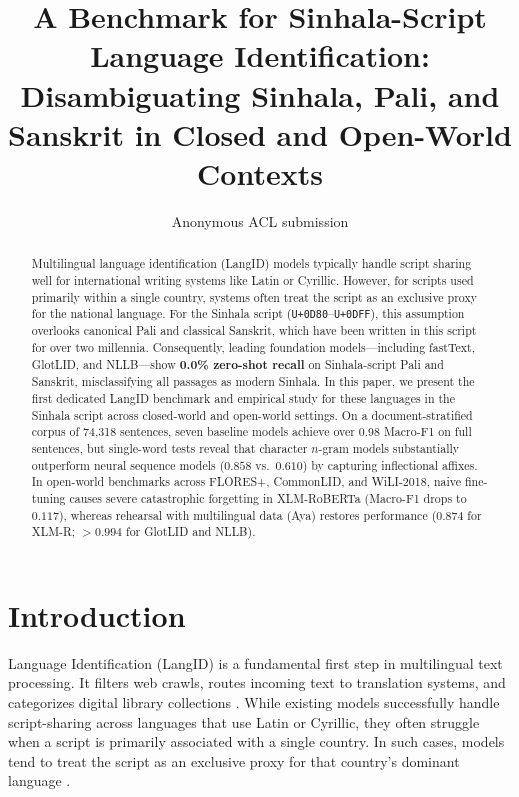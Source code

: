 \documentclass[11pt]{article}
\title{A Benchmark for Sinhala-Script Language Identification: \\ Disambiguating Sinhala, Pali, and Sanskrit in Closed and Open-World Contexts}
\author{Anonymous ACL submission}
\begin{document}
\maketitle

\begin{abstract}
Multilingual language identification (LangID) models typically handle script sharing well for international writing systems like Latin or Cyrillic. However, for scripts used primarily within a single country, systems often treat the script as an exclusive proxy for the national language. For the Sinhala script (\texttt{U+0D80}--\texttt{U+0DFF}), this assumption overlooks canonical Pali and classical Sanskrit, which have been written in this script for over two millennia. Consequently, leading foundation models---including fastText, GlotLID, and NLLB---show \textbf{0.0\% zero-shot recall} on Sinhala-script Pali and Sanskrit, misclassifying all passages as modern Sinhala. In this paper, we present the first dedicated LangID benchmark and empirical study for these languages in the Sinhala script across closed-world and open-world settings. On a document-stratified corpus of 74,318 sentences, seven baseline models achieve over 0.98 Macro-F1 on full sentences, but single-word tests reveal that character $n$-gram models substantially outperform neural sequence models ($0.858$ vs.\ $0.610$) by capturing inflectional affixes. In open-world benchmarks across FLORES+, CommonLID, and WiLI-2018, naive fine-tuning causes severe catastrophic forgetting in XLM-RoBERTa (Macro-F1 drops to $0.117$), whereas rehearsal with multilingual data (Aya) restores performance ($0.874$ for XLM-R; $>0.994$ for GlotLID and NLLB).
\end{abstract}

\section{Introduction}
Language Identification (LangID) is a fundamental first step in multilingual text processing. It filters web crawls, routes incoming text to translation systems, and categorizes digital library collections \cite{jauhiainen2019automatic,lui-baldwin-2012-langid,caswell-etal-2020-language}. While existing models successfully handle script-sharing across languages that use Latin or Cyrillic, they often struggle when a script is primarily associated with a single country. In such cases, models tend to treat the script as an exclusive proxy for that country's dominant language \cite{kargaran-etal-2023-glotlid,costa2022no}.
\end{document}
